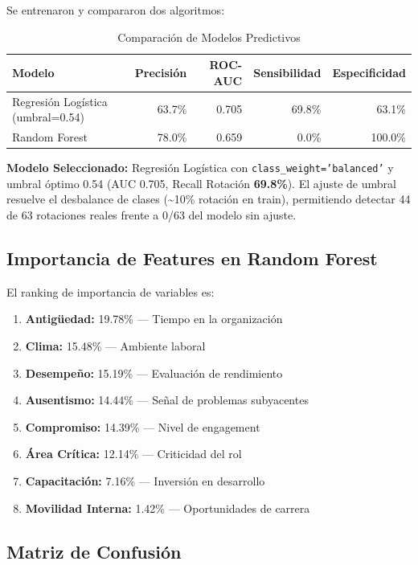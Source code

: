 \documentclass[11pt,a4paper,twoside]{article}
\begin{document}
Se entrenaron y compararon dos algoritmos:

\begin{table}[H]
    \centering
    \caption{Comparación de Modelos Predictivos}
    \begin{tabular}{|l|r|r|r|r|}
        \toprule
        \textbf{Modelo} & \textbf{Precisión} & \textbf{ROC-AUC} & \textbf{Sensibilidad} & \textbf{Especificidad} \\
        \midrule
        Regresión Logística (umbral=0.54) & 63.7\% & 0.705 & 69.8\% & 63.1\% \\
        Random Forest & 78.0\% & 0.659 & 0.0\% & 100.0\% \\ %
        \bottomrule
    \end{tabular}
\end{table}

\textbf{Modelo Seleccionado:} Regresión Logística con \texttt{class\_weight='balanced'} y umbral óptimo 0.54 (AUC 0.705, Recall Rotación \textbf{69.8\%}). El ajuste de umbral resuelve el desbalance de clases (\textasciitilde10\% rotación en train), permitiendo detectar 44 de 63 rotaciones reales frente a 0/63 del modelo sin ajuste.

\subsection{Importancia de Features en Random Forest}

El ranking de importancia de variables es:

\begin{enumerate}
    \item \textbf{Antigüedad:} 19.78\% — Tiempo en la organización
    \item \textbf{Clima:} 15.48\% — Ambiente laboral
    \item \textbf{Desempeño:} 15.19\% — Evaluación de rendimiento
    \item \textbf{Ausentismo:} 14.44\% — Señal de problemas subyacentes
    \item \textbf{Compromiso:} 14.39\% — Nivel de engagement
    \item \textbf{Área Crítica:} 12.14\% — Criticidad del rol
    \item \textbf{Capacitación:} 7.16\% — Inversión en desarrollo
    \item \textbf{Movilidad Interna:} 1.42\% — Oportunidades de carrera
\end{enumerate}

\subsection{Matriz de Confusión}
\end{document}
